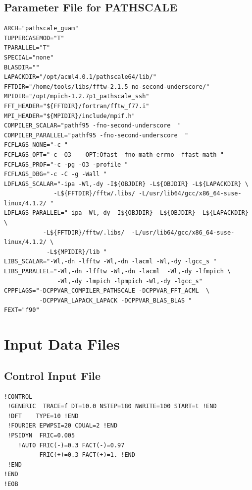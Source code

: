 \documentclass[a4paper,10pt]{report}
\begin{document}
\newpage
\section{Parameter File for PATHSCALE}
\begin{verbatim}
ARCH="pathscale_guam"
TUPPERCASEMOD="T"
TPARALLEL="T"
SPECIAL="none"
BLASDIR=""
LAPACKDIR="/opt/acml4.0.1/pathscale64/lib/"
FFTDIR="/home/tools/libs/fftw-2.1.5_no-second-underscore/"
MPIDIR="/opt/mpich-1.2.7p1_pathscale_ssh"
FFT_HEADER="${FFTDIR}/fortran/fftw_f77.i"
MPI_HEADER="${MPIDIR}/include/mpif.h"
COMPILER_SCALAR="pathf95 -fno-second-underscore  "
COMPILER_PARALLEL="pathf95 -fno-second-underscore  "
FCFLAGS_NONE="-c "
FCFLAGS_OPT="-c -O3   -OPT:Ofast -fno-math-errno -ffast-math "
FCFLAGS_PROF="-c -pg -O3 -profile "
FCFLAGS_DBG="-c -C -g -Wall "
LDFLAGS_SCALAR="-ipa -Wl,-dy -I${OBJDIR} -L${OBJDIR} -L${LAPACKDIR} \
              -L${FFTDIR}/fftw/.libs/ -L/usr/lib64/gcc/x86_64-suse-linux/4.1.2/ "
LDFLAGS_PARALLEL="-ipa -Wl,-dy -I${OBJDIR} -L${OBJDIR} -L${LAPACKDIR} \
           -L${FFTDIR}/fftw/.libs/  -L/usr/lib64/gcc/x86_64-suse-linux/4.1.2/ \
            -L${MPIDIR}/lib "
LIBS_SCALAR="-Wl,-dn -lfftw -Wl,-dn -lacml -Wl,-dy -lgcc_s "
LIBS_PARALLEL="-Wl,-dn -lfftw -Wl,-dn -lacml  -Wl,-dy -lfmpich \
               -Wl,-dy -lmpich -lpmpich -Wl,-dy -lgcc_s"
CPPFLAGS="-DCPPVAR_COMPILER_PATHSCALE -DCPPVAR_FFT_ACML  \
          -DCPPVAR_LAPACK_LAPACK -DCPPVAR_BLAS_BLAS "
FEXT="f90"
\end{verbatim}



\newpage
\chapter{Input Data Files}
\section{Control Input File}
\begin{verbatim}
!CONTROL
 !GENERIC  TRACE=f DT=10.0 NSTEP=180 NWRITE=100 START=t !END
 !DFT    TYPE=10 !END
 !FOURIER EPWPSI=20 CDUAL=2 !END
 !PSIDYN  FRIC=0.005
    !AUTO FRIC(-)=0.3 FACT(-)=0.97
          FRIC(+)=0.3 FACT(+)=1. !END
 !END
!END
!EOB
\end{verbatim}
\end{document}
